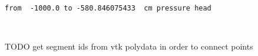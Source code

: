 \documentclass[11pt]{article}
\begin{document}
    \begin{Verbatim}[commandchars=\\\{\}]
from  -1000.0 to -580.846075433  cm pressure head

    \end{Verbatim}

    \begin{center}
    \end{center}
    { \hspace*{\fill} \\}
    
    TODO get segment ids from vtk polydata in order to connect points


    
    
    
    
\end{document}
